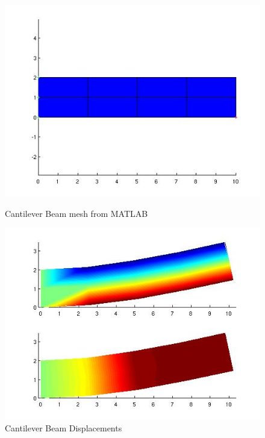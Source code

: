 \begin{figure}[htbp]
  \begin{minipage}{0.45\linewidth}
    \includegraphics[width=\linewidth]{fig/cantilever_beam_mesh_matlab.jpg}
    \caption{Cantilever Beam mesh from MATLAB}
    \label{fig:CantileverBeamMeshMATLAB}
  \end{minipage}
  \hfill
  \begin{minipage}{0.45\linewidth}
    \includegraphics[width=\linewidth]{fig/cantilever_beam_disp_matlab.jpg}
    \caption{Cantilever Beam Displacements}
    \label{fig:CantileverBeamDisplacements}
  \end{minipage}
\end{figure}

